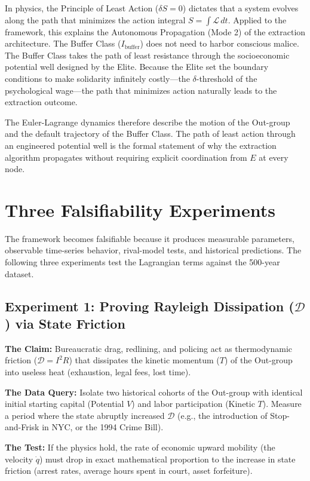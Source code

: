In physics, the Principle of Least Action ($\delta S = 0$) dictates that a system evolves along the path that minimizes the action integral $S = \int \mathcal{L}\,dt$. Applied to the framework, this explains the Autonomous Propagation (Mode 2) of the extraction architecture. The Buffer Class ($I_{\text{buffer}}$) does not need to harbor conscious malice. The Buffer Class takes the path of least resistance through the socioeconomic potential well designed by the Elite. Because the Elite set the boundary conditions to make solidarity infinitely costly---the $\delta$-threshold of the psychological wage---the path that minimizes action naturally leads to the extraction outcome.

The Euler-Lagrange dynamics therefore describe the motion of the Out-group and the default trajectory of the Buffer Class. The path of least action through an engineered potential well is the formal statement of why the extraction algorithm propagates without requiring explicit coordination from $E$ at every node.

\section{Three Falsifiability Experiments}

The framework becomes falsifiable because it produces measurable parameters, observable time-series behavior, rival-model tests, and historical predictions. The following three experiments test the Lagrangian terms against the 500-year dataset.

\subsection{Experiment 1: Proving Rayleigh Dissipation ($\mathcal{D}$) via State Friction}

\textbf{The Claim:} Bureaucratic drag, redlining, and policing act as thermodynamic friction ($\mathcal{D} = I^2R$) that dissipates the kinetic momentum ($T$) of the Out-group into useless heat (exhaustion, legal fees, lost time).

\textbf{The Data Query:} Isolate two historical cohorts of the Out-group with identical initial starting capital (Potential $V$) and labor participation (Kinetic $T$). Measure a period where the state abruptly increased $\mathcal{D}$ (e.g., the introduction of Stop-and-Frisk in NYC, or the 1994 Crime Bill).

\textbf{The Test:} If the physics hold, the rate of economic upward mobility (the velocity $\dot{q}$) must drop in exact mathematical proportion to the increase in state friction (arrest rates, average hours spent in court, asset forfeiture).

